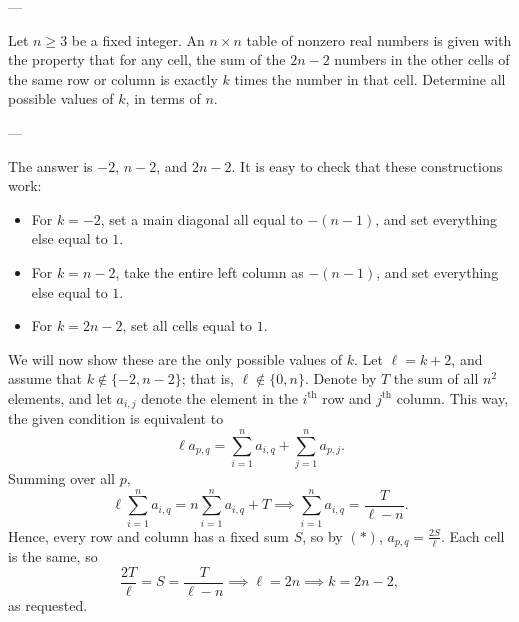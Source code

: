 
---

Let $n\ge 3$ be a fixed integer. An $n\times n$ table of nonzero real numbers is given with the property that for any cell, the sum of the $2n-2$ numbers in the other cells of the same row or column is exactly $k$ times the number in that cell. Determine all possible values of $k$, in terms of $n$.

---

The answer is $-2$, $n-2$, and $2n-2$. It is easy to check that these constructions work:
\begin{itemize}
    \item For $k=-2$, set a main diagonal all equal to $-(n-1)$, and set everything else equal to $1$.
        \vspace{-0.5em}
    \item For $k=n-2$, take the entire left column as $-(n-1)$, and set everything else equal to $1$.
        \vspace{-0.5em}
    \item For $k=2n-2$, set all cells equal to $1$.
\end{itemize}
We will now show these are the only possible values of $k$. Let $\ell=k+2$, and assume that $k\notin\{-2,n-2\}$; that is, $\ell\notin\{0,n\}$. Denote by $T$ the sum of all $n^2$ elements, and let $a_{i,j}$ denote the element in the $i^\text{th}$ row and $j^\text{th}$ column. This way, the given condition is equivalent to
\begin{equation}\tag{$*$}
    \ell a_{p,q}=\sum_{i=1}^n a_{i,q}+\sum_{j=1}^n a_{p,j}.
\end{equation}
Summing over all $p$, \[\ell\sum_{i=1}^na_{i,q}=n\sum_{i=1}^na_{i,q}+T\implies\sum_{i=1}^na_{i,q}=\frac T{\ell-n}.\]
Hence, every row and column has a fixed sum $S$, so by $(*)$, $a_{p,q}=\tfrac{2S}\ell$. Each cell is the same, so \[\frac{2T}\ell=S=\frac T{\ell-n}\implies\ell=2n\implies k=2n-2,\]
as requested.

